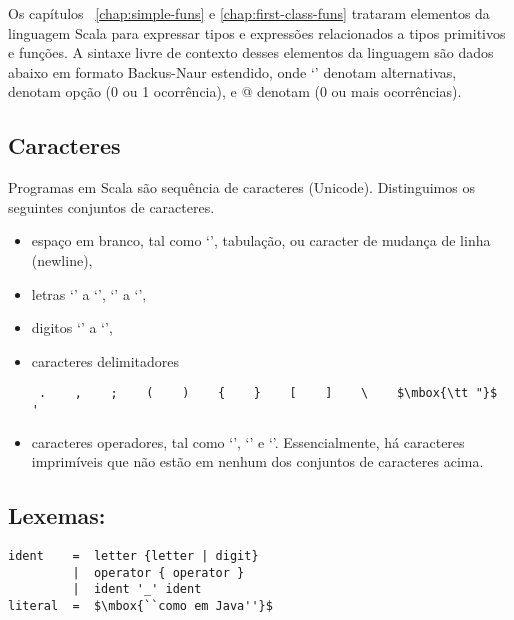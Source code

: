  Os cap\'{i}tulos ~\ref{chap:simple-funs} e \ref{chap:first-class-funs} trataram
elementos da linguagem Scala para expressar tipos e express\~{o}es relacionados a
tipos primitivos e fun\c{c}\~{o}es. A sintaxe livre de contexto desses elementos da
linguagem s\~{a}o dados abaixo em formato Backus-Naur estendido, onde `\code{|}'
denotam alternativas, \code{[...]} denotam op\c{c}\~{a}o  (0 ou 1 ocorr\^{e}ncia), e  
@ denotam (0 ou mais ocorr\^{e}ncias). 
\subsection*{Caracteres}
Programas em Scala s\~{a}o sequ\^{e}ncia de caracteres (Unicode). Distinguimos os
seguintes conjuntos de caracteres.
 \begin{itemize}
 \item
espa\c{c}o em branco, tal como `\code{ }', tabula\c{c}\~{a}o, ou caracter de mudan\c{c}a de linha (newline), 
 \item
letras `' a `', `' a `',    
 \item
digitos `' a `',   
 \item
caracteres delimitadores
 \begin{lstlisting}
 .    ,    ;    (    )    {    }    [    ]    \    $\mbox{\tt "}$    '
 \end{lstlisting}
 \item
caracteres operadores, tal como `\code{#}', `\code{+}' e `\code{:}'.
Essencialmente, h\'{a} caracteres imprim\'{i}veis que n\~{a}o est\~{a}o em nenhum dos 
conjuntos de caracteres acima.   
 \end{itemize}

\subsection*{Lexemas:}

\begin{lstlisting}
ident    =  letter {letter | digit}
         |  operator { operator }
         |  ident '_' ident
literal  =  $\mbox{``como em Java''}$
\end{lstlisting}

